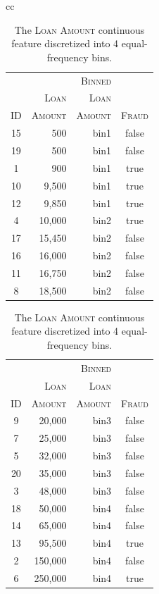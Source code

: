 \documentclass[xcolor={table}]{beamer}
\newcommand{\featN}[1]{\textsc{#1}}
\begin{document}
 \begin{frame} [plain]
\begin{table}[htb]
\caption{The \featN{Loan Amount} continuous feature discretized into 4 equal-frequency bins.}
\label{tab:equalfrequencybinning}
\centering
\begin{tiny}
\begin{tabular}{cc}
		\hline
			\begin{minipage}{0.46\textwidth}
\begin{tabular}{crrc}
~ & \featN{} & \featN{Binned} & ~\\
~ & \featN{Loan} & \featN{Loan} & ~\\
\featN{ID} & \featN{Amount} & \featN{Amount} & \featN{Fraud}\\
\hline
15 & 	500 & 	bin1 &false\\
19 & 	500 & 	bin1 &false\\
1 & 900 & bin1 & true\\
10 & 	9,500 & 	bin1 &true\\
12 & 	9,850 & 	bin1 &true\\
4 & 	10,000 & 	bin2 &true\\
17 & 	15,450 & 	bin2 &false\\
16 & 	16,000 & 	bin2 &false\\
11 & 	16,750 & 	bin2 &false\\
8 & 	18,500 & 	bin2 &false\\
\hline
\end{tabular}
\end{minipage}
\begin{minipage}{0.46\textwidth}
\begin{tabular}{crrc}
~ & \featN{} & \featN{Binned} & ~\\
~ & \featN{Loan} & \featN{Loan} & ~\\
\featN{ID} & \featN{Amount} & \featN{Amount} & \featN{Fraud}\\
\hline
9 & 	20,000 & 	bin3 &false\\
7 & 	25,000 & 	bin3 &false\\
5 & 	32,000 & 	bin3 &false\\
20 & 	35,000 & 	bin3 &false\\
3 & 	48,000 & 	bin3 &false\\
18 & 	50,000 & 	bin4 &false\\
14 & 	65,000 & 	bin4 &false\\
13 & 	95,500 & 	bin4 &true\\
2 & 	150,000 & 	bin4 &false\\
6 & 	250,000 & 	bin4 &true\\
\hline
\end{tabular}
\end{minipage}
\end{tabular}
\end{tiny}
\end{table}
\end{frame} 
\end{document}
